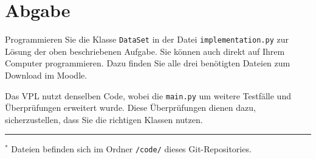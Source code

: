 \documentclass[a4paper,12pt]{article}
\begin{document}
\section{Abgabe}
Programmieren Sie die Klasse \texttt{DataSet} in der Datei \texttt{implementation.py} zur Lösung der oben beschriebenen Aufgabe. Sie können auch direkt auf Ihrem Computer programmieren. Dazu finden Sie alle drei benötigten Dateien zum Download im Moodle.

Das VPL nutzt denselben Code, wobei die \texttt{main.py} um weitere Testfälle und Überprüfungen erweitert wurde. Diese Überprüfungen dienen dazu, sicherzustellen, dass Sie die richtigen Klassen nutzen.

\vspace{1em}
\hrule
\vspace{0.5em}
\noindent\footnotesize $^*$ Dateien befinden sich im Ordner \texttt{/code/} dieses Git-Repositories.
\end{document}
